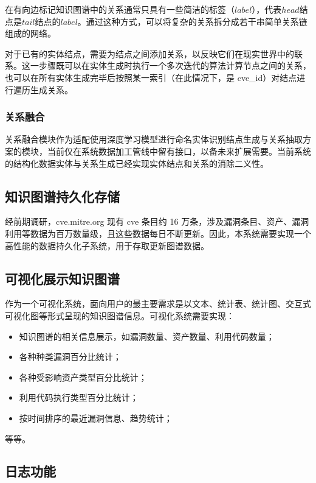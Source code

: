 \documentclass[a4paper,AutoFakeBold,oneside,12pt]{book}
\begin{document}
在有向边标记知识图谱中的关系通常只具有一些简洁的标签（$label$），代表$head$结点是$tail$结点的$label$。\cite{hogan_knowledge_2022}通过这种方式，可以将复杂的关系拆分成若干串简单关系链组成的网络。

对于已有的实体结点，需要为结点之间添加关系，以反映它们在现实世界中的联系。这一步骤既可以在实体生成时执行一个多次迭代的算法计算节点之间的关系，也可以在所有实体生成完毕后按照某一索引（在此情况下，是 cve{\_}id）对结点进行遍历生成关系。

\subsubsection{关系融合}

关系融合模块作为适配使用深度学习模型进行命名实体识别结点生成与关系抽取方案的模块，当前仅在系统数据加工管线中留有接口，以备未来扩展需要。当前系统的结构化数据实体与关系生成已经实现实体结点和关系的消除二义性。

\subsection{知识图谱持久化存储}

经前期调研，cve.mitre.org 现有 cve 条目约 16 万条，涉及漏洞条目、资产、漏洞利用等数据为百万数量级，且这些数据每日不断更新。因此，本系统需要实现一个高性能的数据持久化子系统，用于存取更新图谱数据。

\subsection{可视化展示知识图谱}

作为一个可视化系统，面向用户的最主要需求是以文本、统计表、统计图、交互式可视化图等形式呈现的知识图谱信息。可视化系统需要实现：
\begin{itemize}
	\item 知识图谱的相关信息展示，如漏洞数量、资产数量、利用代码数量；
	\item 各种种类漏洞百分比统计；
	\item 各种受影响资产类型百分比统计；
	\item 利用代码执行类型百分比统计；
	\item 按时间排序的最近漏洞信息、趋势统计；
\end{itemize}
等等。

\subsection{日志功能}
\end{document}
